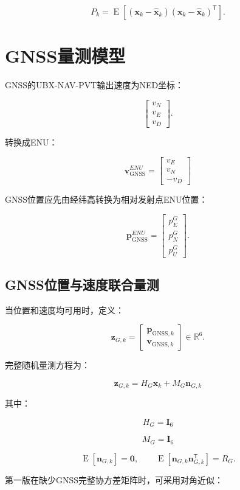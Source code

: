 \documentclass[12pt,a4paper]{ctexart}
\newcommand{\I}{\mathbf I}
\newcommand{\zero}{\mathbf 0}
\newcommand{\xhat}{\hat{\mathbf x}}
\newcommand{\transpose}{^{\mathsf T}}
\newcommand{\E}{\operatorname{E}}
\begin{document}
\[
P_k =
\E\left[
(\mathbf x_k-\xhat_k)
(\mathbf x_k-\xhat_k)\transpose
\right].
\]

\section{GNSS量测模型}

GNSS的UBX-NAV-PVT输出速度为NED坐标：

\[
\begin{bmatrix}
v_N\\v_E\\v_D
\end{bmatrix}.
\]

转换成ENU：

\[
\boxed{
\mathbf v_{\mathrm{GNSS}}^{ENU}
=
\begin{bmatrix}
v_E\\
v_N\\
-v_D
\end{bmatrix}
}
\]

GNSS位置应先由经纬高转换为相对发射点ENU位置：

\[
\mathbf p_{\mathrm{GNSS}}^{ENU}
=
\begin{bmatrix}
p_E^{G}\\
p_N^{G}\\
p_U^{G}
\end{bmatrix}.
\]

\subsection{GNSS位置与速度联合量测}

当位置和速度均可用时，定义：

\[
\boxed{
\mathbf z_{G,k} =
\begin{bmatrix}
\mathbf p_{\mathrm{GNSS},k}\\
\mathbf v_{\mathrm{GNSS},k}
\end{bmatrix}
}
\in\mathbb R^6.
\]

完整随机量测方程为：

\[
\boxed{
\mathbf z_{G,k}
=
H_G\mathbf x_k
+
M_G\mathbf n_{G,k}
}
\]

其中：

\[
\boxed{
H_G=\I_6
}
\]

\[
\boxed{
M_G=\I_6
}
\]

\[
\E[\mathbf n_{G,k}] = \zero,
\qquad
\E[\mathbf n_{G,k}\mathbf n_{G,k}\transpose] = R_G.
\]

第一版在缺少GNSS完整协方差矩阵时，可采用对角近似：
\end{document}
